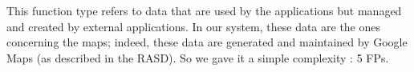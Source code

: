 This function type refers to data that are used by the applications but managed and created by external applications.
\newline
In our system, these data are the ones concerning the maps; indeed, these data are generated and maintained by Google Maps (as described in the RASD).
\newline
So we gave it a simple complexity : 5 FPs.
